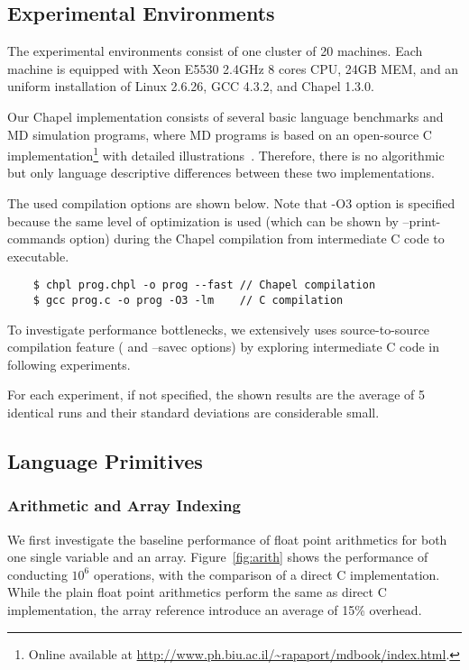 \subsection{Experimental Environments}
The experimental environments consist of one cluster of 20 machines. Each
machine is equipped with Xeon E5530 2.4GHz 8 cores CPU, 24GB MEM, and an
uniform installation of Linux 2.6.26, GCC 4.3.2, and Chapel 1.3.0.

Our Chapel implementation consists of several basic language benchmarks and
\ac{MD} simulation programs, where \ac{MD} programs is based on an open-source
C implementation\footnote{ Online available at
\url{http://www.ph.biu.ac.il/~rapaport/mdbook/index.html}.} with detailed
illustrations~\cite{rapaport04md}. Therefore, there is no algorithmic but only
language descriptive differences between these two implementations.

The used compilation options are shown below. Note that {\ic -O3} option is
specified because the same level of optimization is used (which can be shown by
{\ic --print-commands} option) during the Chapel compilation from intermediate
C code to executable.
\begin{lstlisting}
    $ chpl prog.chpl -o prog --fast // Chapel compilation
    $ gcc prog.c -o prog -O3 -lm    // C compilation
\end{lstlisting}
To investigate performance bottlenecks, we extensively uses source-to-source
compilation feature ( and {\ic --savec} options) by exploring
intermediate C code in following experiments.

For each experiment, if not specified, the shown results are the average of 5
identical runs and their standard deviations are considerable small.

\subsection{Language Primitives}
\subsubsection{Arithmetic and Array Indexing}
We first investigate the baseline performance of float point arithmetics for
both one single variable and an array.  Figure~\ref{fig:arith} shows the
performance of conducting $10^6$ operations, with the comparison of a direct C
implementation. While the plain float point arithmetics perform the same as
direct C implementation, the array reference introduce an average of 15\%
overhead.

